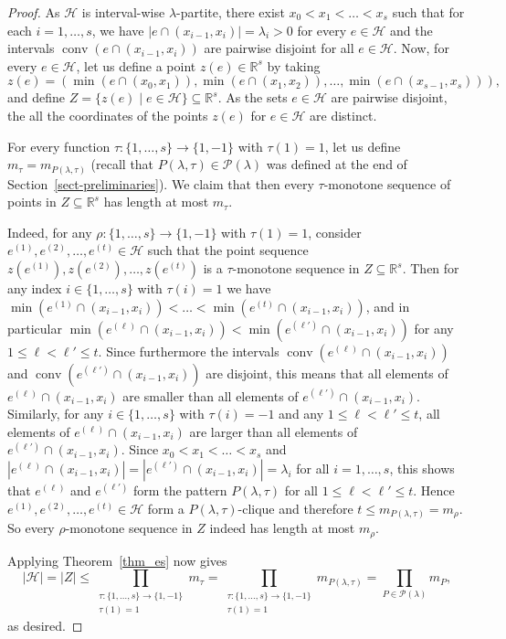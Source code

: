 \documentclass{aic}
\theoremstyle{definition}
\numberwithin{equation}{section}
\numberwithin{figure}{section}
\newcommand{\su}{\subseteq}
\newcommand{\HH}{\mathcal{H}}
\newcommand{\conv}{\operatorname{conv}}
\newcommand{\PP}{\mathcal{P}}
\begin{document}
\begin{proof} 
    As $\HH$ is interval-wise $\lambda$-partite, there exist $x_0<x_1<\dots<x_{s}$ such that for each $i=1,\dots,s$, we have $|e\cap (x_{i-1},x_i)|=\lambda_i>0$ for every $e\in \HH$ and the intervals $\conv(e\cap (x_{i-1},x_i))$ are pairwise disjoint for all $e\in \HH$. Now, for every $e\in \HH$, let us define a point $z(e)\in \mathbb{R}^s$ by taking
    \[z(e)=(\min(e\cap (x_{0},x_1)), \min(e\cap (x_{1},x_2)), \dots, \min(e\cap (x_{s-1},x_s))),\]
    and define $Z=\{ z(e)\mid e\in \HH\}\su \mathbb{R}^s$. As the sets $e\in \HH$ are pairwise disjoint, the all the coordinates of the points $z(e)$ for $e\in \HH$ are distinct.
    
    For every function $\tau:\{1,\dots,s\}\to \{1,-1\}$ with $\tau(1)=1$, let us define $m_\tau=m_{P(\lambda,\tau)}$ (recall that $P(\lambda,\tau)\in \PP(\lambda)$ was defined at the end of Section~\ref{sect-preliminaries}). We claim that then every  $\tau$-monotone sequence of points in $Z\su \mathbb{R}^s$ has length at most $m_\tau$.

    Indeed, for any $\rho:\{1,\dots,s\}\to \{1,-1\}$ with $\tau(1)=1$, consider $e^{(1)},e^{(2)},\dots,e^{(t)}\in \HH$ such that the point sequence $z(e^{(1)}),z(e^{(2)}),\dots,z(e^{(t)})$ is a $\tau$-monotone sequence in $Z \su \mathbb{R}^s$. Then for any index $i\in \{1,\dots,s\}$ with $\tau(i)=1$ we have  $\min(e^{(1)}\cap (x_{i-1},x_i))< \dots <\min(e^{(t)}\cap (x_{i-1},x_i))$, and in particular $\min(e^{(\ell)}\cap (x_{i-1},x_i))<\min(e^{(\ell')}\cap (x_{i-1},x_i))$ for any $1\le \ell<\ell'\le t$. Since furthermore the intervals $\conv(e^{(\ell)}\cap (x_{i-1},x_i))$ and $\conv(e^{(\ell')}\cap (x_{i-1},x_i))$ are disjoint, this means that all elements of $e^{(\ell)}\cap (x_{i-1},x_i)$ are smaller than all elements of $e^{(\ell')}\cap (x_{i-1},x_i)$. Similarly, for any $i\in \{1,\dots,s\}$ with $\tau(i)=-1$ and any $1\le \ell<\ell'\le t$, all elements of $e^{(\ell)}\cap (x_{i-1},x_i)$ are larger than all elements of $e^{(\ell')}\cap (x_{i-1},x_i)$. Since $x_0<x_1<\dots<x_{s}$ and $|e^{(\ell)}\cap (x_{i-1},x_i)|=|e^{(\ell')}\cap (x_{i-1},x_i)|=\lambda_i$ for all  $i=1,\dots,s$, this shows that  $e^{(\ell)}$ and $e^{(\ell')}$ form the pattern $P(\lambda,\tau)$ for all $1\le \ell<\ell'\le t$. Hence $e^{(1)},e^{(2)},\dots,e^{(t)}\in \HH$ form a $P(\lambda,\tau)$-clique and therefore $t\le m_{P(\lambda,\tau)}=m_\rho$. So every $\rho$-monotone sequence in $Z$ indeed has length at most $m_\rho$.

    Applying Theorem~\ref{thm_es} now gives
    \[|\HH|=|Z|\le \prod_{\substack{\tau:\{1,\dots,s\}\to \{1,-1\}\\ \tau(1)=1}} m_{\tau}=\prod_{\substack{\tau:\{1,\dots,s\}\to \{1,-1\}\\ \tau(1)=1}} m_{P(\lambda,\tau)}=\prod_{P\in \PP(\lambda)} m_{P},\]
    as desired.
\end{proof}
\end{document}
